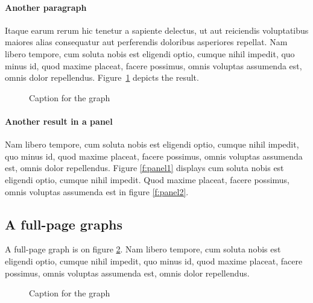 \documentclass[letterpaper,12pt,leqno]{article}
\newcommand{\pdf}{figures.pdf}
\begin{document}
\paragraph{Another paragraph} Itaque earum rerum hic tenetur a sapiente delectus, ut aut reiciendis voluptatibus maiores alias consequatur aut perferendis doloribus asperiores repellat. Nam libero tempore, cum soluta nobis est eligendi optio, cumque nihil impedit, quo minus id, quod maxime placeat, facere possimus, omnis voluptas assumenda est, omnis dolor repellendus. Figure~\ref{f:graph1} depicts the result.


\begin{figure}[t]
\hfill
{}
\caption{Caption for the graph}
\label{f:graph1}\end{figure}

\paragraph{Another result in a panel} Nam libero tempore, cum soluta nobis est eligendi optio, cumque nihil impedit, quo minus id, quod maxime placeat, facere possimus, omnis voluptas assumenda est, omnis dolor repellendus. Figure \ref{f:panel1} displays cum soluta nobis est eligendi optio, cumque nihil impedit. Quod maxime placeat, facere possimus, omnis voluptas assumenda est in figure \ref{f:panel2}.

\subsection{A full-page graphs}

A full-page graph is on figure \ref{f:graph2}. Nam libero tempore, cum soluta nobis est eligendi optio, cumque nihil impedit, quo minus id, quod maxime placeat, facere possimus, omnis voluptas assumenda est, omnis dolor repellendus.

\begin{figure}[p]
\hfill
{}\vfig
{}\hfill
{}\vfig
{}\hfill
{}
\caption{Caption for the graph}
\label{f:graph2}\end{figure}
\end{document}
